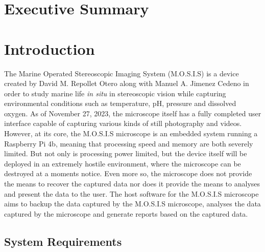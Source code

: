 \documentclass[12pt]{article}
\begin{document}

\section*{Executive Summary}
\tableofcontents
\section{Introduction}
The Marine Operated Stereoscopic Imaging System (M.O.S.I.S) is a device created by David M. Repollet Otero along with Manuel A. Jimenez Cedeno in order to study marine life \textit{in situ} in stereoscopic vision while capturing environmental conditions such as temperature, pH, pressure and dissolved oxygen. As of November 27, 2023, the microscope itself has a fully completed user interface capable of capturing various kinds of still photography and videos. However, at its core, the M.O.S.I.S microscope is an embedded system running a Raspberry Pi 4b, meaning that processing speed and memory are both severely limited. But not only is processing power limited, but the device itself will be deployed in an extremely hostile environment, where the microscope can be destroyed at a moments notice. Even more so, the microscope does not provide the means to recover the captured data nor does it provide the means to analyses and present the data to the user. The host software for the M.O.S.I.S microscope aims to backup the data captured by the M.O.S.I.S microscope, analyses the data captured by the microscope and generate reports based on the captured data.\\
\subsection{System Requirements}
\end{document}
